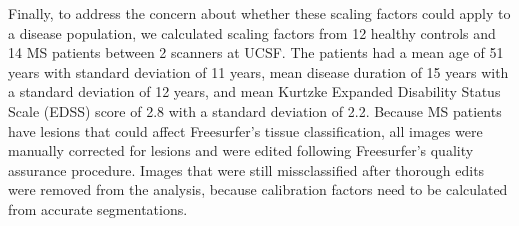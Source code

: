 Finally, to address the concern about whether these scaling factors could apply to a disease population, we calculated scaling factors from 12 healthy controls and 14 MS patients between 2 scanners at UCSF. The patients had a mean age of 51 years with standard deviation of 11 years, mean disease duration of 15 years with a standard deviation of 12 years, and mean Kurtzke Expanded Disability Status Scale (EDSS) score of 2.8 with a standard deviation of 2.2. Because MS patients have lesions that could affect Freesurfer's tissue classification, all images were manually corrected for lesions and were edited following Freesurfer's quality assurance procedure. Images that were still missclassified after thorough edits were removed from the analysis, because calibration factors need to be calculated from accurate segmentations.